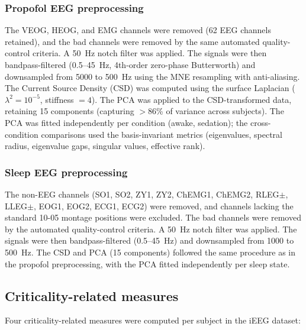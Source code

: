 \documentclass[preprint,12pt,nonatbib]{elsarticle}
\begin{document}
\subsubsection{Propofol EEG preprocessing}
The VEOG, HEOG, and EMG channels were removed (62 EEG channels retained), and the bad channels were removed by the same automated quality-control criteria. A 50~Hz notch filter was applied. The signals were then bandpass-filtered (0.5--45~Hz, 4th-order zero-phase Butterworth) and downsampled from 5000 to 500~Hz using the MNE resampling with anti-aliasing. The Current Source Density (CSD) was computed using the surface Laplacian ($\lambda^2=10^{-5}$, stiffness $=4$). The PCA was applied to the CSD-transformed data, retaining 15 components (capturing $>$86\% of variance across subjects). The PCA was fitted independently per condition (awake, sedation); the cross-condition comparisons used the basis-invariant metrics (eigenvalues, spectral radius, eigenvalue gaps, singular values, effective rank).

\subsubsection{Sleep EEG preprocessing}
The non-EEG channels (SO1, SO2, ZY1, ZY2, ChEMG1, ChEMG2, RLEG$\pm$, LLEG$\pm$, EOG1, EOG2, ECG1, ECG2) were removed, and channels lacking the standard 10-05 montage positions were excluded. The bad channels were removed by the automated quality-control criteria. A 50~Hz notch filter was applied. The signals were then bandpass-filtered (0.5--45~Hz) and downsampled from 1000 to 500~Hz. The CSD and PCA (15 components) followed the same procedure as in the propofol preprocessing, with the PCA fitted independently per sleep state.

\subsection{Criticality-related measures}

Four criticality-related measures were computed per subject in the iEEG dataset:
\end{document}
